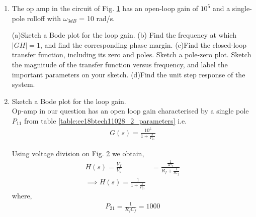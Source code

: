 \begin{enumerate}[label=\arabic*.,ref=\theenumi]
\item The op amp in the circuit of Fig. \ref{fig:ee18btech11028_2_q} has an open-loop gain of $10^{5}$ and a single-pole rolloff with $\omega_{3dB}$ = 10 rad/s.

\renewcommand{\thefigure}{\theenumi.\arabic{figure}}
%
\begin{figure}[!ht]
	\begin{center}
		\resizebox{\columnwidth}{!}{}
	\end{center}
\caption{}
\label{fig:ee18btech11028_2_q}
\end{figure}
%
\begin{table}[!ht]
    \centering
    
    \caption{}
    \label{table:ee18btech11028_2_parameters}
\end{table}
(a)Sketch a Bode plot for the loop gain.
(b) Find the frequency at which $ |GH|= 1$, and find the corresponding phase margin.
(c)Find the closed-loop transfer function, including its zero
and poles. Sketch a pole-zero plot. Sketch the magnitude of
the transfer function versus frequency, and label the important parameters on your sketch.
(d)Find the unit step response of the system.
\item Sketch a Bode plot for the loop gain.
\\
\solution
Op-amp in our question has an open loop gain characterised by a single pole $P_{11} $ from table \ref{table:ee18btech11028_2_parameters} i.e.
\begin{align}
    G(s) = \frac{10^5}{1 + \frac{s}{P_{11}}}
        \label{eq:ee18btech11028_2_2}
\end{align}
\begin{figure}[!ht]
	\begin{center}
		\resizebox{\columnwidth}{!}{}
	\end{center}
\caption{}
\label{fig:ee18btech11028_2_h}
\end{figure}
Using voltage division on Fig. \ref{fig:ee18btech11028_2_h} we obtain,
\begin{align}
    H(s) = \frac{V_{f}}{V_{o}}
     &= \frac{\frac{1}{sC_{f}}}{R_{f} + \frac{1}{sC_{f}}}
    \\
    \implies H(s) = \frac{1}{1 + \frac{s}{P_{21}}}
        \label{eq:ee18btech11028_2_1}
\end{align}
where, 
\begin{align}
    P_{21} = \frac{1}{R_{f}C_{f}} = 1000
\end{align}


\end{enumerate}
